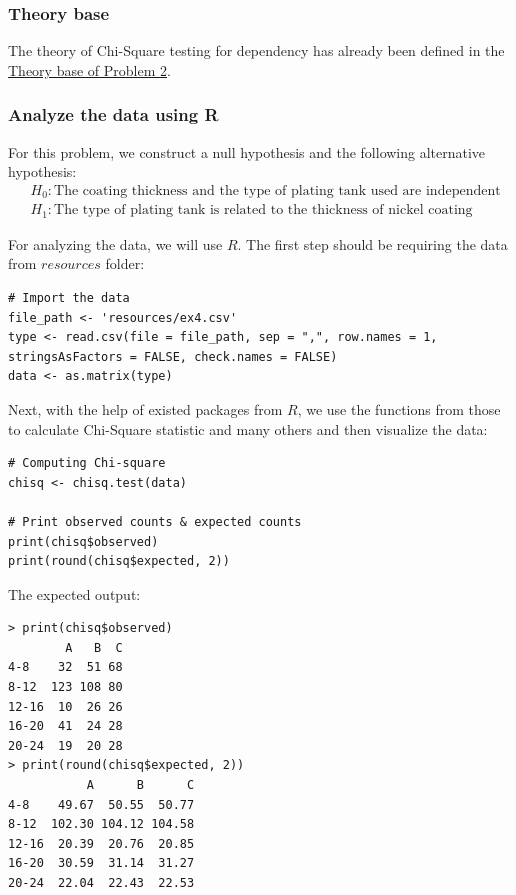 \documentclass[a4paper]{article}
\numberwithin{equation}{section}
\begin{document}
\subsubsection{Theory base}
The theory of Chi-Square testing for dependency has already been defined in the \hyperref[p2:theory]{\underline{Theory base of Problem 2}}.

\subsubsection{Analyze the data using R}
For this problem, we construct a null hypothesis and the following alternative hypothesis:
\begin{align*}
   & H_0 : \text{The coating thickness and the type of plating tank used are independent} \\
   & H_1 : \text{The type of plating tank is related to the thickness of nickel coating}
\end{align*}

For analyzing the data, we will use \(R\). The first step should be requiring the data from \(resources\) folder:
\begin{mdframed}[leftline=false,rightline=false,backgroundcolor=magenta!10,nobreak=true]
  \begin{verbatim}
# Import the data
file_path <- 'resources/ex4.csv'
type <- read.csv(file = file_path, sep = ",", row.names = 1, stringsAsFactors = FALSE, check.names = FALSE)
data <- as.matrix(type)
  \end{verbatim}
\end{mdframed}

Next, with the help of existed packages from \(R\), we use the functions from those to calculate Chi-Square statistic and many others and then visualize the data:
\begin{mdframed}[leftline=false,rightline=false,backgroundcolor=magenta!10,nobreak=true]
  \begin{verbatim}
# Computing Chi-square
chisq <- chisq.test(data)

# Print observed counts & expected counts
print(chisq$observed)
print(round(chisq$expected, 2))
  \end{verbatim}
\end{mdframed}

The expected output:
\begin{mdframed}[leftline=false,rightline=false,backgroundcolor=magenta!10,nobreak=true]
  \begin{verbatim}
> print(chisq$observed)
        A   B  C
4-8    32  51 68
8-12  123 108 80
12-16  10  26 26
16-20  41  24 28
20-24  19  20 28
> print(round(chisq$expected, 2))
           A      B      C
4-8    49.67  50.55  50.77
8-12  102.30 104.12 104.58
12-16  20.39  20.76  20.85
16-20  30.59  31.14  31.27
20-24  22.04  22.43  22.53
  \end{verbatim}
\end{mdframed}
\end{document}
